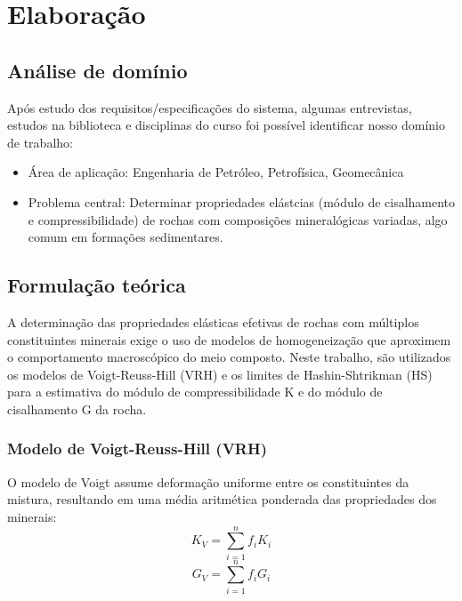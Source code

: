 
\chapter{Elaboração\label{sec:Elabora=0000E7=0000E3o}}

\section{Análise de domínio\label{sec:An=0000E1lise-de-dom=0000EDnio}}

Após estudo dos requisitos/especificações do sistema, algumas entrevistas, estudos na biblioteca e disciplinas do curso foi possível identificar nosso domínio de trabalho:
\begin{itemize}
\item Área de aplicação: Engenharia de Petróleo, Petrofísica, Geomecânica
\item Problema central: Determinar propriedades elástcias (módulo de cisalhamento e compressibilidade) de rochas com composições mineralógicas variadas, algo comum em formações sedimentares.
\end{itemize}

\section{Formulação teórica\label{sec:Formula=0000E7=0000E3o-te=0000F3rica}}
A determinação das propriedades elásticas efetivas de rochas com múltiplos constituintes minerais exige o uso de modelos de homogeneização que aproximem o comportamento macroscópico do meio composto. Neste trabalho, são utilizados os modelos de Voigt-Reuss-Hill (VRH) e os limites de Hashin-Shtrikman (HS) para a estimativa do módulo de compressibilidade K e do módulo de cisalhamento G da rocha.

\subsection{Modelo de Voigt-Reuss-Hill (VRH)}
O modelo de Voigt assume deformação uniforme entre os constituintes da mistura, resultando em uma média aritmética ponderada das propriedades dos minerais:
\begin{equation}
K_V = \sum_{i=1}^{n} f_i K_i
\end{equation}
\begin{equation}
G_V = \sum_{i=1}^{n} f_i G_i
\end{equation}

